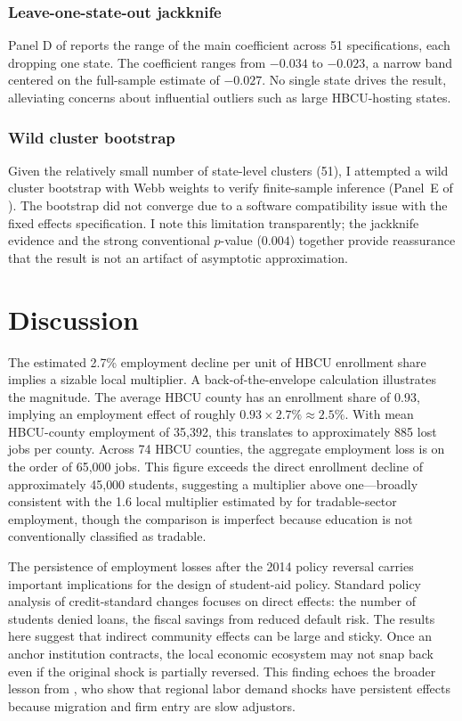 \documentclass[12pt]{article}
\begin{document}
\subsubsection*{Leave-one-state-out jackknife} Panel D of  reports the range of the main coefficient across 51 specifications, each dropping one state. The coefficient ranges from $-0.034$ to $-0.023$, a narrow band centered on the full-sample estimate of $-0.027$. No single state drives the result, alleviating concerns about influential outliers such as large HBCU-hosting states.

\subsubsection*{Wild cluster bootstrap} Given the relatively small number of state-level clusters (51), I attempted a wild cluster bootstrap with Webb weights to verify finite-sample inference (Panel~E of ). The bootstrap did not converge due to a software compatibility issue with the fixed effects specification. I note this limitation transparently; the jackknife evidence and the strong conventional $p$-value ($0.004$) together provide reassurance that the result is not an artifact of asymptotic approximation.



\section{Discussion}
\label{sec:discussion}

The estimated 2.7\% employment decline per unit of HBCU enrollment share implies a sizable local multiplier. A back-of-the-envelope calculation illustrates the magnitude. The average HBCU county has an enrollment share of 0.93, implying an employment effect of roughly $0.93 \times 2.7\% \approx 2.5\%$. With mean HBCU-county employment of 35{,}392, this translates to approximately 885 lost jobs per county. Across 74 HBCU counties, the aggregate employment loss is on the order of 65{,}000 jobs. This figure exceeds the direct enrollment decline of approximately 45{,}000 students, suggesting a multiplier above one---broadly consistent with the 1.6 local multiplier estimated by \citet{moretti2010} for tradable-sector employment, though the comparison is imperfect because education is not conventionally classified as tradable.

The persistence of employment losses after the 2014 policy reversal carries important implications for the design of student-aid policy. Standard policy analysis of credit-standard changes focuses on direct effects: the number of students denied loans, the fiscal savings from reduced default risk. The results here suggest that indirect community effects can be large and sticky. Once an anchor institution contracts, the local economic ecosystem may not snap back even if the original shock is partially reversed. This finding echoes the broader lesson from \citet{blanchard1992}, who show that regional labor demand shocks have persistent effects because migration and firm entry are slow adjustors.
\end{document}
